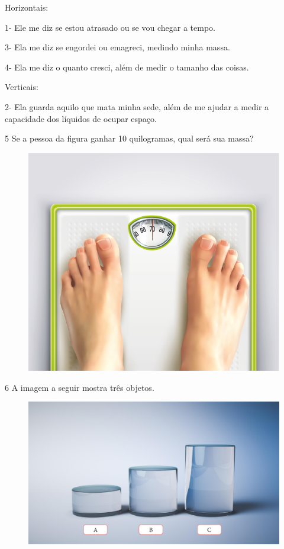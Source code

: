 Horizontais:

1- Ele me diz se estou atrasado ou se vou chegar a tempo.

3- Ela me diz se engordei ou emagreci, medindo minha massa.

4- Ela me diz o quanto cresci, além de medir o tamanho das coisas.

Verticais:

2- Ela guarda aquilo que mata minha sede, além de me ajudar a medir a
capacidade dos líquidos de ocupar espaço.

\vspace*{1em}

\num{5} Se a pessoa da figura ganhar 10 quilogramas, qual será sua massa?


\begin{figure}[H]
\centering
\includegraphics[width=.5\textwidth]{./media/image32.png}
\end{figure}


\num{6} A imagem a seguir mostra três objetos.


\begin{figure}[htpb!]
\centering
\includegraphics[width=.8\textwidth]{./media/image34.png}
\end{figure}

